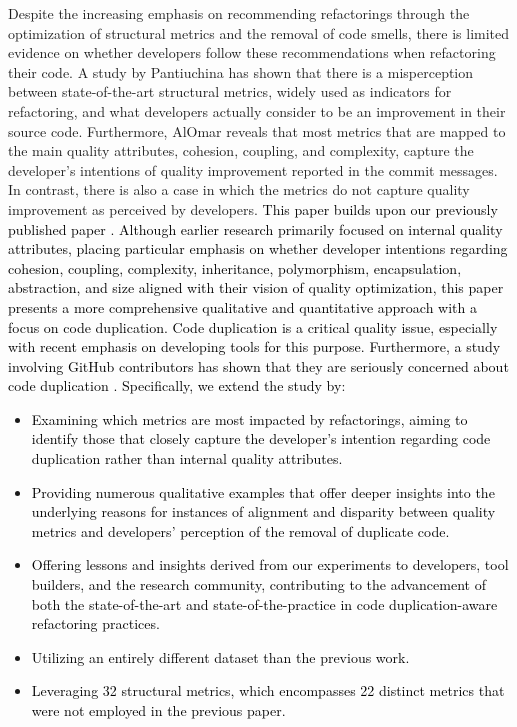 Despite the increasing emphasis on recommending refactorings through the optimization of structural metrics and the removal of code smells, there is limited evidence on whether developers follow these recommendations when refactoring their code. A study by Pantiuchina \etal \citep{pantiuchina2018improving} has shown that there is a misperception between state-of-the-art structural metrics, widely used as indicators for refactoring, and what developers actually consider to be an improvement in their source code. Furthermore, AlOmar \etal \citep{alomar2019impact} reveals that most metrics that are mapped to the main quality
attributes, \ie cohesion, coupling, and complexity, capture the developer's intentions of quality improvement reported in the
commit messages. In contrast, there is also a case in which
the metrics do not capture quality improvement as perceived
by developers. \textcolor{black}{This paper builds upon our previously published paper \citep{alomar2019impact}. Although earlier research primarily focused on internal quality attributes, placing particular emphasis on whether developer intentions regarding cohesion, coupling, complexity, inheritance, polymorphism, encapsulation, abstraction, and size aligned with their vision of quality optimization, this paper presents a more comprehensive qualitative and quantitative approach with a focus on code duplication. Code duplication is a critical quality issue, especially with recent emphasis on developing tools for this purpose. Furthermore, a study involving GitHub contributors has shown that they are seriously concerned about code duplication \citep{silva2016we}. Specifically, we extend the study by}:
 \begin{itemize}
     \item \textcolor{black}{Examining which metrics are most impacted by refactorings, aiming to identify those that closely capture the developer's intention regarding code duplication rather than internal quality attributes.}
    \item \textcolor{black}{Providing numerous qualitative examples that offer deeper insights into the underlying reasons for instances of alignment and disparity between quality metrics and developers' perception of the removal of duplicate code.}
   \item \textcolor{black}{Offering lessons and insights derived from our experiments to developers, tool builders, and the research community, contributing to the advancement of both the state-of-the-art and state-of-the-practice in code duplication-aware refactoring practices.}
   \item \textcolor{black}{Utilizing an entirely different dataset than the previous work.}
\item \textcolor{black}{Leveraging 32 structural metrics, which encompasses 22 distinct metrics that were not employed in the previous paper.}
     \end{itemize}










